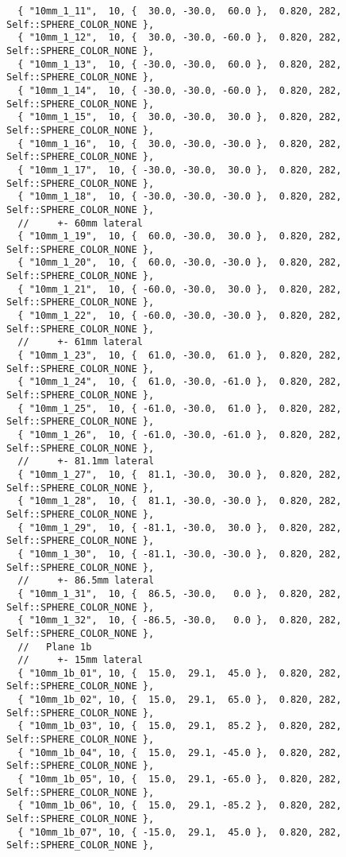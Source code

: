 \documentclass{InsightArticle}
\begin{document}
{\begin{verbatim}
  { "10mm_1_11",  10, {  30.0, -30.0,  60.0 },  0.820, 282, Self::SPHERE_COLOR_NONE },
  { "10mm_1_12",  10, {  30.0, -30.0, -60.0 },  0.820, 282, Self::SPHERE_COLOR_NONE },
  { "10mm_1_13",  10, { -30.0, -30.0,  60.0 },  0.820, 282, Self::SPHERE_COLOR_NONE },
  { "10mm_1_14",  10, { -30.0, -30.0, -60.0 },  0.820, 282, Self::SPHERE_COLOR_NONE },
  { "10mm_1_15",  10, {  30.0, -30.0,  30.0 },  0.820, 282, Self::SPHERE_COLOR_NONE },
  { "10mm_1_16",  10, {  30.0, -30.0, -30.0 },  0.820, 282, Self::SPHERE_COLOR_NONE },
  { "10mm_1_17",  10, { -30.0, -30.0,  30.0 },  0.820, 282, Self::SPHERE_COLOR_NONE },
  { "10mm_1_18",  10, { -30.0, -30.0, -30.0 },  0.820, 282, Self::SPHERE_COLOR_NONE },
  //     +- 60mm lateral
  { "10mm_1_19",  10, {  60.0, -30.0,  30.0 },  0.820, 282, Self::SPHERE_COLOR_NONE },
  { "10mm_1_20",  10, {  60.0, -30.0, -30.0 },  0.820, 282, Self::SPHERE_COLOR_NONE },
  { "10mm_1_21",  10, { -60.0, -30.0,  30.0 },  0.820, 282, Self::SPHERE_COLOR_NONE },
  { "10mm_1_22",  10, { -60.0, -30.0, -30.0 },  0.820, 282, Self::SPHERE_COLOR_NONE },
  //     +- 61mm lateral
  { "10mm_1_23",  10, {  61.0, -30.0,  61.0 },  0.820, 282, Self::SPHERE_COLOR_NONE },
  { "10mm_1_24",  10, {  61.0, -30.0, -61.0 },  0.820, 282, Self::SPHERE_COLOR_NONE },
  { "10mm_1_25",  10, { -61.0, -30.0,  61.0 },  0.820, 282, Self::SPHERE_COLOR_NONE },
  { "10mm_1_26",  10, { -61.0, -30.0, -61.0 },  0.820, 282, Self::SPHERE_COLOR_NONE },
  //     +- 81.1mm lateral
  { "10mm_1_27",  10, {  81.1, -30.0,  30.0 },  0.820, 282, Self::SPHERE_COLOR_NONE },
  { "10mm_1_28",  10, {  81.1, -30.0, -30.0 },  0.820, 282, Self::SPHERE_COLOR_NONE },
  { "10mm_1_29",  10, { -81.1, -30.0,  30.0 },  0.820, 282, Self::SPHERE_COLOR_NONE },
  { "10mm_1_30",  10, { -81.1, -30.0, -30.0 },  0.820, 282, Self::SPHERE_COLOR_NONE },
  //     +- 86.5mm lateral
  { "10mm_1_31",  10, {  86.5, -30.0,   0.0 },  0.820, 282, Self::SPHERE_COLOR_NONE },
  { "10mm_1_32",  10, { -86.5, -30.0,   0.0 },  0.820, 282, Self::SPHERE_COLOR_NONE },
  //   Plane 1b
  //     +- 15mm lateral
  { "10mm_1b_01", 10, {  15.0,  29.1,  45.0 },  0.820, 282, Self::SPHERE_COLOR_NONE },
  { "10mm_1b_02", 10, {  15.0,  29.1,  65.0 },  0.820, 282, Self::SPHERE_COLOR_NONE },
  { "10mm_1b_03", 10, {  15.0,  29.1,  85.2 },  0.820, 282, Self::SPHERE_COLOR_NONE },
  { "10mm_1b_04", 10, {  15.0,  29.1, -45.0 },  0.820, 282, Self::SPHERE_COLOR_NONE },
  { "10mm_1b_05", 10, {  15.0,  29.1, -65.0 },  0.820, 282, Self::SPHERE_COLOR_NONE },
  { "10mm_1b_06", 10, {  15.0,  29.1, -85.2 },  0.820, 282, Self::SPHERE_COLOR_NONE },
  { "10mm_1b_07", 10, { -15.0,  29.1,  45.0 },  0.820, 282, Self::SPHERE_COLOR_NONE },

\end{verbatim}}
\end{document}

